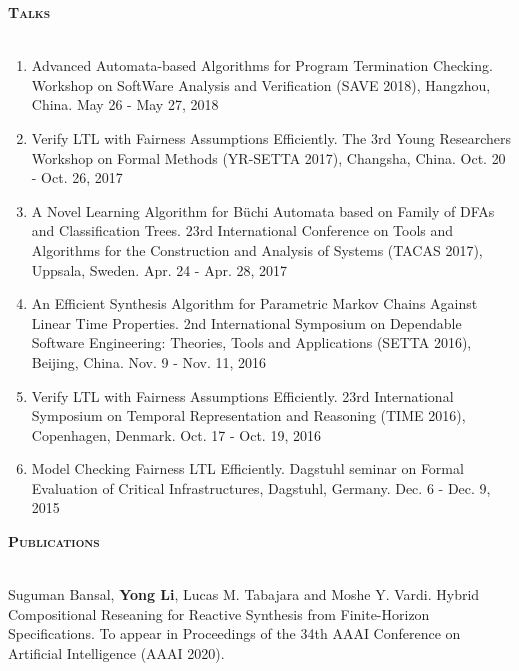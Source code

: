 \documentclass[a4paper]{article}
\newcommand{\lineunder} {
    \vspace*{-8pt} \\
    \hspace*{-18pt} \hrulefill \\
}
\newcommand{\header} [1] {
    {\hspace*{-18pt}\vspace*{6pt} \textsc{#1}}
    \vspace*{-6pt} \lineunder
}
\begin{document}
\begin{CJK*}{UTF8}{gkai}
\vspace{2mm}

\header{\textbf{Talks}}

\begin{enumerate}
\item Advanced Automata-based Algorithms for Program Termination Checking.
Workshop on SoftWare Analysis and Verification (SAVE 2018), Hangzhou, China.
May 26 - May 27, 2018

\item Verify LTL with Fairness Assumptions Efficiently.
The 3rd Young Researchers Workshop on Formal Methods (YR-SETTA 2017), Changsha, China.
Oct. 20 - Oct. 26, 2017

\item A Novel Learning Algorithm for {B\"uchi} Automata based on Family of {DFA}s and Classification Trees.
23rd International Conference on Tools and Algorithms for the Construction and Analysis of Systems  (TACAS 2017), Uppsala, Sweden.
Apr. 24 - Apr. 28, 2017

\item An Efficient Synthesis Algorithm for Parametric Markov Chains Against Linear Time Properties.
2nd International Symposium on Dependable Software Engineering: Theories, Tools and Applications (SETTA 2016), Beijing, China.
Nov. 9 - Nov. 11, 2016

\item Verify LTL with Fairness Assumptions Efficiently.
23rd International Symposium on Temporal Representation and Reasoning (TIME 2016), Copenhagen, Denmark.
Oct. 17 - Oct. 19, 2016

\item Model Checking Fairness LTL Efficiently.
Dagstuhl seminar on Formal Evaluation of Critical Infrastructures, Dagstuhl, Germany.
Dec. 6 - Dec. 9, 2015
\end{enumerate}


\header{\textbf{Publications}}

\iffalse
\begin{enumerate}[label={[\theenumi]},leftmargin=\parindent,align=left,labelwidth=\parindent,labelsep=4pt]

\item 
Suguman Bansal, \textbf{Yong Li}, Lucas M. Tabajara and Moshe Y. Vardi.
Hybrid Compositional Reseaning for Reactive Synthesis from Finite-Horizon Specifications.
To appear in Proceedings of the 34th AAAI Conference on Artificial Intelligence (AAAI 2020).


\end{enumerate}
\end{CJK*}
\end{document}
